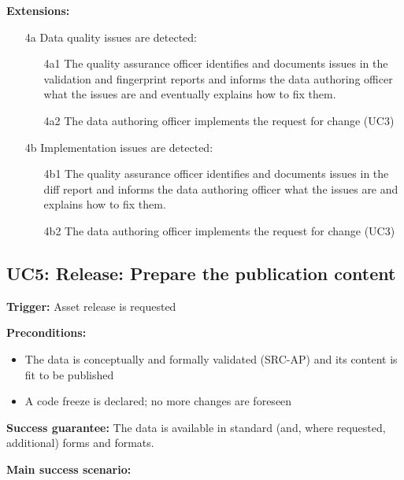 	\textbf{Extensions:}
	
	\begin{enumerate}
		\item [4a] Data quality issues are detected:
		\begin{enumerate}
			\item [4a1] The quality assurance officer identifies  and documents issues in the validation and fingerprint reports and informs the data authoring officer what the issues are and eventually explains how to fix them.
			\item [4a2] The data authoring officer implements the request for change (UC3)			
		\end{enumerate}
		\item [4b] Implementation issues are detected:
		\begin{enumerate}
			\item [4b1] The quality assurance officer identifies and documents issues in the diff report and informs the data authoring officer what the issues are and explains how to fix them.
			\item [4b2] The data authoring officer implements the request for change (UC3)			
		\end{enumerate}
	\end{enumerate}


	\subsection{UC5: Release: Prepare the publication content}
	\label{sec:uc5}
	\textbf{Trigger:} Asset release is requested
	
	\textbf{Preconditions:} 
	\begin{itemize}
		\item The data is conceptually and formally validated (SRC-AP) and its content is fit to be published
		\item A code freeze is declared; no more changes are foreseen
	\end{itemize}
	
	\textbf{Success guarantee:} The data is available in standard (and, where requested, additional) forms and formats.
	
	\textbf{Main success scenario:}
	

